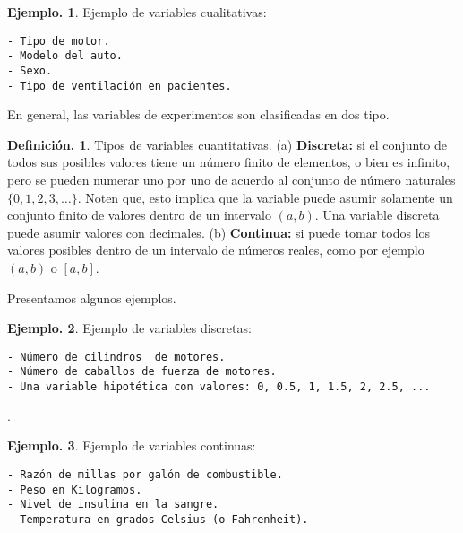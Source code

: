 \documentclass[]{book}
\theoremstyle{definition}
\newtheorem{definition}{Definición.}[chapter]
\theoremstyle{definition}
\newtheorem{example}{Ejemplo.}[chapter]
\theoremstyle{definition}
\theoremstyle{remark}
\begin{document}
\begin{example}
\protect\hypertarget{exm:unnamed-chunk-52}{}{\label{exm:unnamed-chunk-52} }Ejemplo de variables cualitativas:

\begin{verbatim}
- Tipo de motor.
- Modelo del auto.
- Sexo.
- Tipo de ventilación en pacientes.  
\end{verbatim}
\end{example}

En general, las variables de experimentos son
clasificadas en dos tipo.

\begin{definition}
\protect\hypertarget{def:unnamed-chunk-53}{}{\label{def:unnamed-chunk-53} }
Tipos de variables cuantitativas. (a) \textbf{Discreta:} si
el conjunto de todos sus posibles valores
tiene un número finito de elementos, o bien es infinito,
pero se pueden numerar uno por uno de acuerdo al conjunto
de número naturales
\(\{0,1,2,3,\ldots\}\). Noten que, esto implica que la
variable puede asumir solamente un conjunto
finito de valores dentro de un intervalo \((a,b)\). Una
variable discreta puede asumir valores con
decimales. (b) \textbf{Continua:} si puede tomar todos los
valores posibles dentro de un intervalo de
números reales, como por ejemplo \((a,b)\) o \([a,b]\).
\end{definition}

Presentamos algunos ejemplos.

\begin{example}
\protect\hypertarget{exm:unnamed-chunk-54}{}{\label{exm:unnamed-chunk-54} }Ejemplo de variables discretas:

\begin{verbatim}
- Número de cilindros  de motores.
- Número de caballos de fuerza de motores.
- Una variable hipotética con valores: 0, 0.5, 1, 1.5, 2, 2.5, ...
\end{verbatim}

.
\end{example}

\begin{example}
\protect\hypertarget{exm:unnamed-chunk-55}{}{\label{exm:unnamed-chunk-55} }Ejemplo de variables continuas:

\begin{verbatim}
- Razón de millas por galón de combustible. 
- Peso en Kilogramos.
- Nivel de insulina en la sangre.
- Temperatura en grados Celsius (o Fahrenheit).
\end{verbatim}
\end{example}
\end{document}
